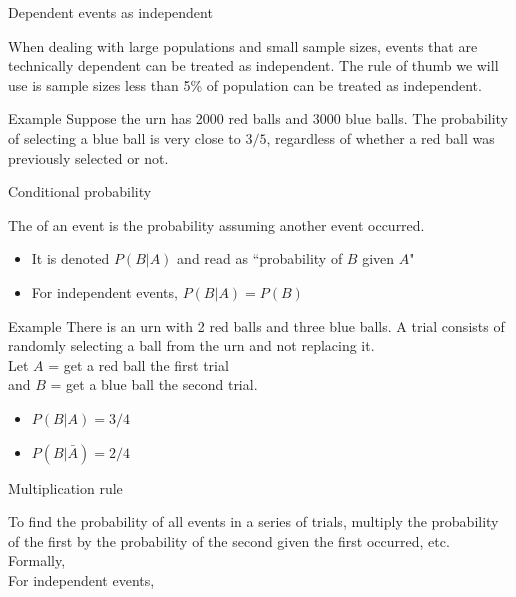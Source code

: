 \documentclass[xcolor=table, aspectratio=169, bigger]{beamer}
\begin{document}
\begin{frame}{Dependent events as independent}
\begin{block}{}
When dealing with large populations and small sample sizes, events that are technically dependent can be treated as independent. The rule of thumb we will use is sample sizes less than 5\% of population can be treated as independent.
\end{block}

\pause
\begin{exampleblock}{Example}
Suppose the urn has 2000 red balls and 3000 blue balls. The probability of selecting a blue ball is very close to $3/5$, regardless of whether a red ball was previously selected or not.
\end{exampleblock}
\end{frame}

\begin{frame}{Conditional probability}
\begin{block}{}
The  of an event is the probability assuming another event occurred. 
\begin{itemize}
\pause
\item It is denoted $P(B|A)$ and read as ``probability of $B$ given $A$"
\pause
\item For independent events, $P(B|A) = P(B)$
\end{itemize}
\end{block}

\pause
\begin{exampleblock}{Example}
There is an urn with 2 red balls and three blue balls. A trial consists of randomly selecting a ball from the urn and not replacing it.\\
\medskip Let $A$ = get a red ball the first trial\\
 and $B$ = get a blue ball the second trial.
\begin{itemize}
\pause
\item $P(B | A) = 3 / 4$
\pause
\item $P(B | \bar A) =  2 / 4$
\end{itemize}

\end{exampleblock}
\end{frame}

\begin{frame}{Multiplication rule}
\begin{block}{}
To find the probability of all events in a series of trials, multiply the probability of the first by the probability of the second given the first occurred, etc.\\
\medskip
\pause
Formally,\\ \smallskip
{}
\pause\medskip
For independent events,\\ \smallskip
{}
\end{block}
\end{frame}
\end{document}

